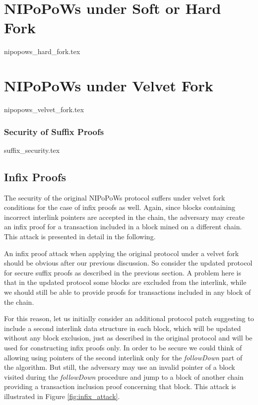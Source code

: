 \documentclass[11pt,a4paper]{article}
\begin{document}
\section{NIPoPoWs under Soft or Hard Fork}
{nipopows_hard_fork.tex}

\section{NIPoPoWs under Velvet Fork}
{nipopows_velvet_fork.tex}


\subsubsection{Security of Suffix Proofs}
{suffix_security.tex}


\subsection{Infix Proofs}
The security of the original NIPoPoWs protocol suffers under velvet fork conditions for the case of infix proofs as well. Again, since blocks containing incorrect interlink pointers are accepted in the chain, the adversary may create an infix proof for a transaction included in a block mined on a different chain. This attack is presented in detail in the following.

An infix proof attack when applying the original protocol under a velvet fork should be obvious after our previous discussion. So consider the updated protocol for secure suffix proofs as described in the previous section. A problem here is that in the updated protocol some blocks are excluded from the interlink, while we should still be able to provide proofs for transactions included in any block of the chain. 

For this reason, let us initially consider an additional protocol patch suggesting to include a second interlink data structure in each block, which will be updated without any block exclusion, just as described in the original protocol and will be used for constructing infix proofs only. In order to be secure we could think of allowing using pointers of the second interlink only for the \textit{followDown} part of the algorithm. But still, the adversary may use an invalid pointer of a block visited during the \textit{followDown} procedure and jump to a block of another chain providing a transaction inclusion proof concerning that block. This attack is illustrated in Figure \ref{fig:infix_attack}.
\end{document}
